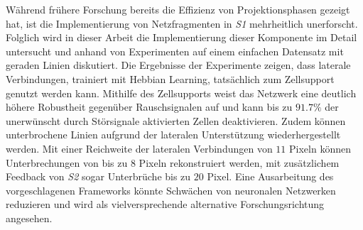 Während frühere Forschung bereits die Effizienz von Projektionsphasen gezeigt hat, ist die Implementierung von Netzfragmenten in \emph{S1} mehrheitlich unerforscht.
Folglich wird in dieser Arbeit die Implementierung dieser Komponente im Detail untersucht und anhand von Experimenten auf einem einfachen Datensatz mit geraden Linien diskutiert. Die Ergebnisse der Experimente zeigen, dass laterale Verbindungen, trainiert mit Hebbian Learning, tatsächlich zum Zellsupport genutzt werden kann.
Mithilfe des Zellsupports weist das Netzwerk eine deutlich höhere Robustheit gegenüber Rauschsignalen auf und kann bis zu $91.7\%$ der unerwünscht durch Störsignale aktivierten Zellen deaktivieren. Zudem können unterbrochene Linien aufgrund der lateralen Unterstützung wiederhergestellt werden. Mit einer Reichweite der lateralen Verbindungen von $11$ Pixeln können Unterbrechungen von bis zu $8$ Pixeln rekonstruiert werden, mit zusätzlichem Feedback von \emph{S2} sogar Unterbrüche bis zu $20$ Pixel. Eine Ausarbeitung des vorgeschlagenen Frameworks könnte Schwächen von neuronalen Netzwerken reduzieren und wird als vielversprechende alternative Forschungsrichtung angesehen.

